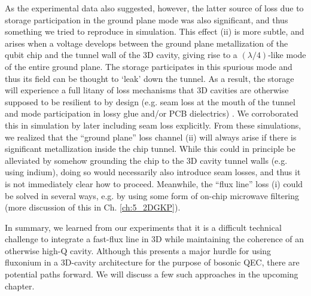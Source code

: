 As the experimental data also suggested, however, the latter source of loss due to storage participation in the ground plane mode was also significant, and thus something we tried to reproduce in simulation. This effect (ii) is more subtle, and arises when a voltage develops between the ground plane metallization of the qubit chip and the tunnel wall of the 3D cavity, giving rise to a $(\lambda/4)$-like mode of the entire ground plane. The storage participates in this spurious mode and thus its field can be thought to `leak' down the tunnel. As a result, the storage will experience a full litany of loss mechanisms that 3D cavities are otherwise supposed to be resilient to by design (e.g. seam loss at the mouth of the tunnel and mode participation in lossy glue and/or PCB dielectrics) \cite{reagor2013reaching,brecht2015demonstration,reagor2016quantum}. We corroborated this in simulation by later including seam loss explicitly. From these simulations, we realized that the ``ground plane'' loss channel (ii) will always arise if there is significant metallization inside the chip tunnel. While this could in principle be alleviated by somehow grounding the chip to the 3D cavity tunnel walls (e.g. using indium), doing so would necessarily also introduce seam losses, and thus it is not immediately clear how to proceed. Meanwhile, the ``flux line'' loss (i) could be solved in several ways, e.g. by using some form of on-chip microwave filtering \cite{pozar2012microwave} (more discussion of this in Ch. \ref{ch:5_2DGKP}).  

In summary, we learned from our experiments that it is a difficult technical challenge to integrate a fast-flux line in 3D while maintaining the coherence of an otherwise high-Q cavity. Although this presents a major hurdle for using fluxonium in a 3D-cavity architecture for the purpose of bosonic QEC, there are potential paths forward. We will discuss a few such approaches in the upcoming chapter. 

\clearpage
\printbibliography[heading=subbibliography, title = References]